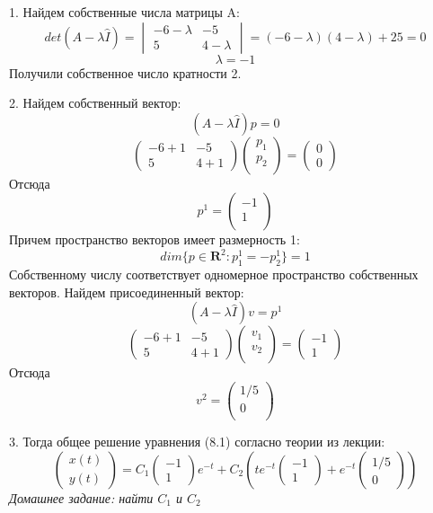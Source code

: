 \documentclass[10pt]{report}
\begin{document}
1. Найдем собственные числа матрицы A:
\[det(A-\lambda \hat{I})=
\begin{vmatrix}
-6-\lambda & -5 \\
5 & 4-\lambda
\end{vmatrix}
=(-6-\lambda)(4-\lambda)+25=0\]
\[\lambda =-1\]
Получили собственное число кратности 2.

2.  Найдем собственный вектор:
\[(A-\lambda \hat{I})p=0\]
\[\left(
\begin{array}{cc}
-6+1 & -5\\
5 & 4+1
\end{array}
\right)
\left(
\begin{array}{cc}
p_1\\
p_2\\
\end{array}
\right)=
\left(
\begin{array}{c}
0\\
0
\end{array}
\right)
\]
Отсюда
\[p^1=
\left(
\begin{array}{cc}
-1\\
1\\
\end{array}
\right)
\]
Причем пространство векторов имеет размерность 1:
\[dim \{ p\in \textbf {R}^2: p_1^1=-p_2^1\}=1\]
Собственному числу соответствует одномерное пространство собственных векторов. Найдем присоединенный вектор:\\
\[(A-\lambda \hat{I})v=p^1\]
\[\left(
\begin{array}{cc}
-6+1 & -5\\
5 & 4+1
\end{array}
\right)
\left(
\begin{array}{cc}
v_1\\
v_2\\
\end{array}
\right)=
\left(
\begin{array}{c}
-1\\
1
\end{array}
\right)
\]
Отсюда
\[v^2=
\left(
\begin{array}{cc}
1/5\\
0\\
\end{array}
\right)
\]

3. Тогда общее решение уравнения (8.1) согласно теории из лекции:
\[
\left(
\begin{array}{c}
x(t)\\
y(t)
\end{array}
\right)
=C_1
\left(
\begin{array}{c}
-1\\
1
\end{array}
\right)
e^{-t}+C_2
\left(
te^{-t}
\left(
\begin{array}{c}
-1\\
1
\end{array}
\right)
+e^{-t}
\left(
\begin{array}{c}
1/5\\
0
\end{array}
\right)
\right)
\]
\textit{Домашнее задание: найти $C_1$ и $C_2$}\\
\end{document}
